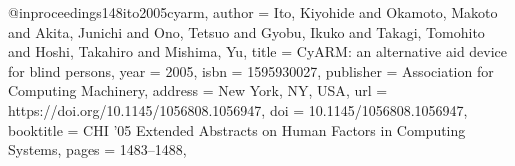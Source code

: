 @inproceedings{148ito2005cyarm,
author = {Ito, Kiyohide and Okamoto, Makoto and Akita, Junichi and Ono, Tetsuo and Gyobu, Ikuko and Takagi, Tomohito and Hoshi, Takahiro and Mishima, Yu},
title = {CyARM: an alternative aid device for blind persons},
year = {2005},
isbn = {1595930027},
publisher = {Association for Computing Machinery},
address = {New York, NY, USA},
url = {https://doi.org/10.1145/1056808.1056947},
doi = {10.1145/1056808.1056947},
booktitle = {CHI '05 Extended Abstracts on Human Factors in Computing Systems},
pages = {1483–1488},
}